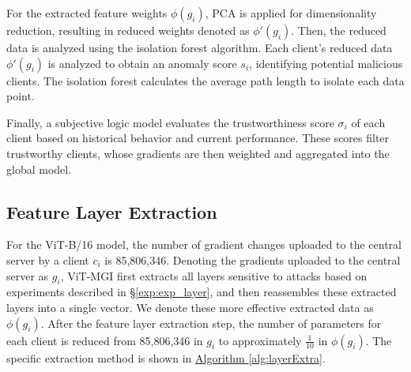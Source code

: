 \documentclass[conference]{IEEEtran}
\begin{document}
For the extracted feature weights $\phi(g_i)$, PCA is applied for dimensionality reduction, resulting in reduced weights denoted as $\phi'(g_i)$. Then, the reduced data is analyzed using the isolation forest algorithm. Each client’s reduced data $\phi'(g_i)$ is analyzed to obtain an anomaly score $s_i$, identifying potential malicious clients. The isolation forest calculates the average path length to isolate each data point.

Finally, a subjective logic model evaluates the trustworthiness score $\sigma_i$ of each client based on historical behavior and current performance. These scores filter trustworthy clients, whose gradients are then weighted and aggregated into the global model.

\subsection{Feature Layer Extraction}
\label{sec:method_layer}



For the ViT-B/16 model, the number of gradient changes uploaded to the central server by a client $c_i$ is 85,806,346. Denoting the gradients uploaded to the central server as $g_i$, ViT-MGI first extracts all layers sensitive to attacks based on experiments described in \hyperref[exp:exp_layer]{§\ref{exp:exp_layer}}, and then reassembles these extracted layers into a single vector. We denote these more effective extracted data as $\phi(g_i)$. After the feature layer extraction step, the number of parameters for each client is reduced from 85,806,346 in $g_i$ to approximately $\frac1{10}$ in $\phi(g_i)$. The specific extraction method is shown in \hyperref[alg:layerExtra]{Algorithm \ref{alg:layerExtra}}.
\end{document}
